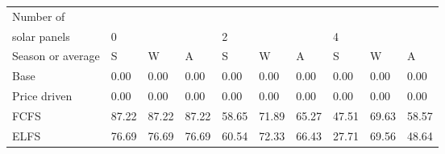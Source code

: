 \begin{table}[h] 
\centering 
\begin{tabular}{l|lll|lll|lll}Number of \\ solar panels&0& & &2& & &4& & \\ \hline 
Season or average & S & W & A & S & W & A & S & W & A \\ \hline 
Base&0.00&0.00&0.00&0.00&0.00&0.00&0.00&0.00&0.00 \\ 
Price driven&0.00&0.00&0.00&0.00&0.00&0.00&0.00&0.00&0.00 \\ 
FCFS&87.22&87.22&87.22&58.65&71.89&65.27&47.51&69.63&58.57 \\ 
ELFS&76.69&76.69&76.69&60.54&72.33&66.43&27.71&69.56&48.64 \\ 
\end{tabular} 
\end{table}